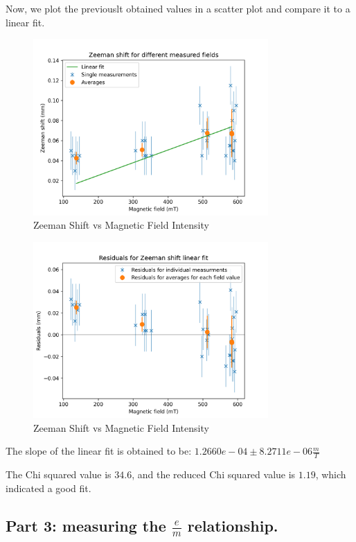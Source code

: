 Now, we plot the previouslt obtained values in a scatter plot and compare it to a linear fit.

\begin{figure}
    \centering
    \includegraphics[width=0.8\textwidth]{Results/img/zeeman_shift_scatter.png}
    \caption{Zeeman Shift vs Magnetic Field Intensity}
\end{figure}

\begin{figure}
    \centering
    \includegraphics[width=0.8\textwidth]{Results/img/zeeman_shift_residuals.png}
    \caption{Zeeman Shift vs Magnetic Field Intensity}
\end{figure}

The slope of the linear fit is obtained to be:
$1.2660e-04 \pm 8.2711e-06 \frac{m}{T}$

The Chi squared value is $34.6$, and the reduced Chi squared value is $1.19$, which indicated a good fit.

\subsection{Part 3: measuring the $\frac{e}{m}$ relationship.}


